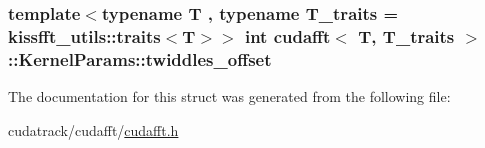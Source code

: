 \subsubsection[{\texorpdfstring{twiddles\+\_\+offset}{twiddles_offset}}]{\setlength{\rightskip}{0pt plus 5cm}template$<$typename T , typename T\+\_\+traits  = kissfft\+\_\+utils\+::traits$<$\+T$>$$>$ int {\bf cudafft}$<$ T, T\+\_\+traits $>$\+::Kernel\+Params\+::twiddles\+\_\+offset}\hypertarget{structcudafft_1_1_kernel_params_a2ee91ebed15013326314b5d803801630}{}\label{structcudafft_1_1_kernel_params_a2ee91ebed15013326314b5d803801630}


The documentation for this struct was generated from the following file\+:\begin{DoxyCompactItemize}
\item 
cudatrack/cudafft/\hyperlink{cudafft_8h}{cudafft.\+h}\end{DoxyCompactItemize}
